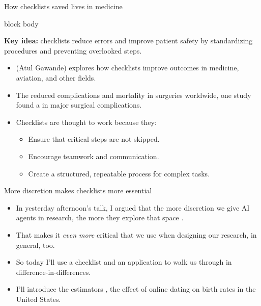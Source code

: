 \documentclass[aspectratio=169,11pt]{beamer}
\newcommand{\emphbox}[1]{%
  \begin{beamercolorbox}[rounded=true,sep=7pt,wd=\linewidth]{block body}%
    \small\color{slate}\raggedright #1%
  \end{beamercolorbox}}
\begin{document}

\begin{frame}{How checklists saved lives in medicine}
\vspace{0.2em}
\emphbox{\textbf{Key idea:} checklists reduce errors and improve patient safety by standardizing procedures and preventing overlooked steps.}
\vspace{0.5em}
\begin{itemize}\small\setlength\itemsep{0.4em}
  \item {} (Atul Gawande) explores how checklists improve outcomes in medicine, aviation, and other fields.
  \item The  reduced complications and mortality in surgeries worldwide, one study found a  in major surgical complications.
  \item Checklists are thought to work because they:
  \begin{itemize}\small
    \item Ensure that critical steps are not skipped.
    \item Encourage teamwork and communication.
    \item Create a structured, repeatable process for complex tasks.
  \end{itemize}
\end{itemize}
\end{frame}

\begin{frame}{More discretion makes checklists more essential}
\vspace{0.4em}
\begin{itemize}\setlength\itemsep{0.7em}
  \item In yesterday afternoon's talk,  I argued that the more discretion we give AI agents in research, the more they explore that space .
  \item That makes it \emph{even more} critical that we use  when designing our research, in general, too.
  \item So today I'll use a checklist and an application to walk us through  in difference-in-differences.
  \item I'll introduce the estimators , the effect of online dating on birth rates in the United States.
\end{itemize}
\end{frame}
\end{document}
